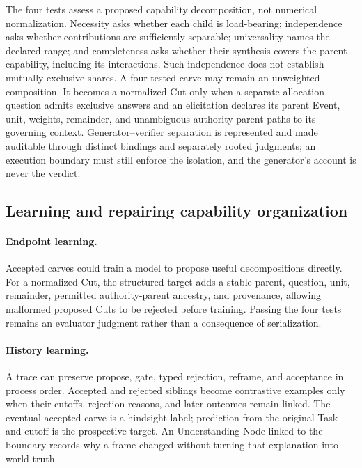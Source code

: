 \documentclass[10pt]{article}
\begin{document}
The four tests assess a proposed capability decomposition, not numerical
normalization. Necessity asks whether each child is load-bearing; independence
asks whether contributions are sufficiently separable; universality names the
declared range; and completeness asks whether their synthesis covers the
parent capability, including its interactions. Such independence does not
establish mutually exclusive shares. A four-tested carve may remain an
unweighted composition. It becomes a normalized Cut only when a separate
allocation question admits exclusive answers and an elicitation declares
its parent Event, unit, weights, remainder, and unambiguous
authority-parent paths to its governing context. Generator--verifier separation is represented and made
auditable through distinct bindings and separately rooted judgments; an execution boundary must still enforce the isolation,
and the generator's account is never the verdict.

\subsection{Learning and repairing capability organization}
\label{sec:capability-organization}

\paragraph{Endpoint learning.}
Accepted carves could train a model to propose useful decompositions directly.
For a normalized Cut, the structured target adds a stable parent, question, unit, remainder,
permitted authority-parent ancestry, and
provenance, allowing malformed proposed Cuts to be rejected before training.
Passing the four tests remains an evaluator judgment rather than a consequence
of serialization.

\paragraph{History learning.}
A trace can preserve propose, gate, typed rejection, reframe, and acceptance in
process order. Accepted and rejected siblings become contrastive examples
only when their cutoffs, rejection reasons, and later outcomes remain linked.
The eventual accepted carve is a hindsight label; prediction from the original
Task and cutoff is the prospective target. An Understanding Node linked to the
boundary records why a frame changed without turning that explanation into
world truth.
\end{document}
